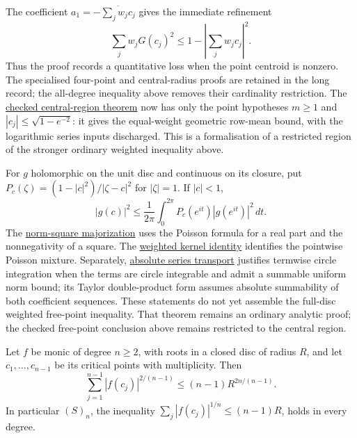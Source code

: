 \documentclass[11pt]{article}
\begin{document}
The coefficient $a_1=-\overline{\sum_jw_jc_j}$ gives the immediate refinement
\[
 \sum_jw_jG(c_j)^2\le1-\left|\sum_jw_jc_j\right|^2.
\]
Thus the proof records a quantitative loss when the point centroid is nonzero.
The specialised four-point and central-radius proofs are retained in the long
record; the all-degree inequality above removes their cardinality restriction.
The \href{https://github.com/wcook04/plectis-erdos/blob/3be82b1a7340284aea72e9a5c8493cb020843921/ErdosProblems/Erdos1041/FreePointCentralCompletion.lean#L39}{checked central-region theorem} now has only the point
hypotheses $m\ge1$ and $|c_j|\le\sqrt{1-e^{-2}}$: it gives the equal-weight
geometric row-mean bound, with the logarithmic series inputs discharged.
This is a formalisation of a restricted region of the stronger ordinary
weighted inequality above.

For $g$ holomorphic on the unit disc and continuous on its closure, put
$P_c(\zeta)=(1-|c|^2)/|\zeta-c|^2$ for $|\zeta|=1$.  If $|c|<1$,
\[
 |g(c)|^2\le\frac1{2\pi}\int_0^{2\pi}
 P_c(e^{it})|g(e^{it})|^2\,dt.
\]
The \href{https://github.com/wcook04/plectis-erdos/blob/d4fed71423840f70f10edf27b9ad27c22fc4f49a/ErdosProblems/Erdos1041/PoissonNormSquare.lean#L114}{norm-square majorization}
uses the Poisson formula for a real part and the nonnegativity of a square.
The \href{https://github.com/wcook04/plectis-erdos/blob/d4fed71423840f70f10edf27b9ad27c22fc4f49a/ErdosProblems/Erdos1041/PoissonKernelBridge.lean#L27}{weighted kernel identity}
identifies the pointwise Poisson mixture.  Separately,
\href{https://github.com/wcook04/plectis-erdos/blob/d4fed71423840f70f10edf27b9ad27c22fc4f49a/ErdosProblems/Erdos1041/CircleSeriesTransport.lean#L49}{absolute series transport}
justifies termwise circle integration when the terms are circle integrable
and admit a summable uniform norm bound; its Taylor double-product form
assumes absolute summability of both coefficient sequences.
These statements do not yet assemble the full-disc weighted free-point
inequality.  That theorem remains an ordinary analytic proof; the checked
free-point conclusion above remains restricted to the central region.


\begin{theorem}\label{res:fp-to-s}
Let $f$ be monic of degree $n\ge2$, with roots in a closed disc of radius
$R$, and let $c_1,\ldots,c_{n-1}$ be its critical points with multiplicity.
Then
\[
 \sum_{j=1}^{n-1}|f(c_j)|^{2/(n-1)}
 \le(n-1)R^{2n/(n-1)}.
\]
In particular $(S)_n$, the inequality
$\sum_j|f(c_j)|^{1/n}\le(n-1)R$, holds in every degree.
\end{theorem}
\end{document}
